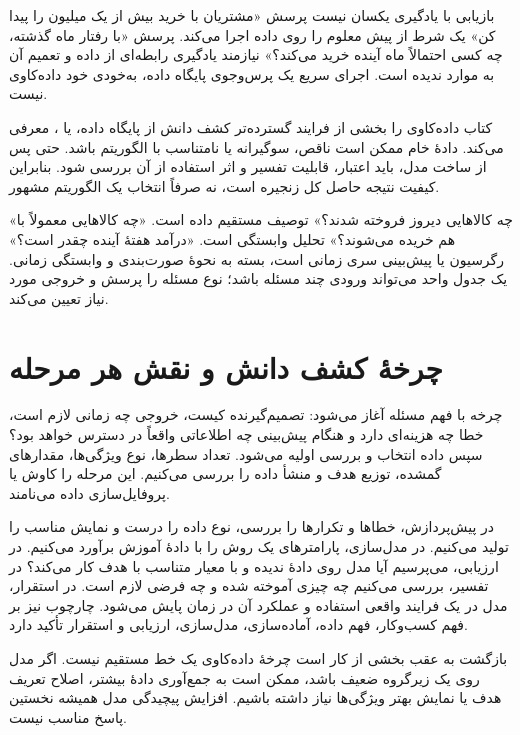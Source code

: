 \documentclass[12pt,a4paper,oneside]{report}
\newcounter{ex}[chapter]
\newenvironment{example}[1]{\refstepcounter{ex}\begin{tcolorbox}[breakable=false,title={مثال \thechapter.\arabic{ex} | #1},colframe=muted,colback=white]}{\end{tcolorbox}}
\begin{document}
\begin{definition}{بازیابی با یادگیری یکسان نیست}
پرسش «مشتریان با خرید بیش از یک میلیون را پیدا کن» یک شرط از پیش معلوم را روی داده اجرا می‌کند. پرسش «با رفتار ماه گذشته، چه کسی احتمالاً ماه آینده خرید می‌کند؟» نیازمند یادگیری رابطه‌ای از داده و تعمیم آن به موارد ندیده است. اجرای سریع یک پرس‌وجوی پایگاه داده، به‌خودی خود داده‌کاوی نیست.
\end{definition}

کتاب داده‌کاوی را بخشی از فرایند گسترده‌تر کشف دانش از پایگاه داده، یا ، معرفی می‌کند. دادهٔ خام ممکن است ناقص، سوگیرانه یا نامتناسب با الگوریتم باشد. حتی پس از ساخت مدل، باید اعتبار، قابلیت تفسیر و اثر استفاده از آن بررسی شود. بنابراین کیفیت نتیجه حاصل کل زنجیره است، نه صرفاً انتخاب یک الگوریتم مشهور.

\begin{example}{سه پرسش دربارهٔ یک فروشگاه}
«چه کالاهایی دیروز فروخته شدند؟» توصیف مستقیم داده است. «چه کالاهایی معمولاً با هم خریده می‌شوند؟» تحلیل وابستگی است. «درآمد هفتهٔ آینده چقدر است؟» رگرسیون یا پیش‌بینی سری زمانی است، بسته به نحوهٔ صورت‌بندی و وابستگی زمانی. یک جدول واحد می‌تواند ورودی چند مسئله باشد؛ نوع مسئله را پرسش و خروجی مورد نیاز تعیین می‌کند.
\end{example}

\section{چرخهٔ کشف دانش و نقش هر مرحله}
چرخه با فهم مسئله آغاز می‌شود: تصمیم‌گیرنده کیست، خروجی چه زمانی لازم است، خطا چه هزینه‌ای دارد و هنگام پیش‌بینی چه اطلاعاتی واقعاً در دسترس خواهد بود؟ سپس داده انتخاب و بررسی اولیه می‌شود. تعداد سطرها، نوع ویژگی‌ها، مقدارهای گمشده، توزیع هدف و منشأ داده را بررسی می‌کنیم. این مرحله را کاوش یا پروفایل‌سازی داده می‌نامند.

در پیش‌پردازش، خطاها و تکرارها را بررسی، نوع داده را درست و نمایش مناسب را تولید می‌کنیم. در مدل‌سازی، پارامترهای یک روش را با دادهٔ آموزش برآورد می‌کنیم. در ارزیابی، می‌پرسیم آیا مدل روی دادهٔ ندیده و با معیار متناسب با هدف کار می‌کند؟ در تفسیر، بررسی می‌کنیم چه چیزی آموخته شده و چه فرضی لازم است. در استقرار، مدل در یک فرایند واقعی استفاده و عملکرد آن در زمان پایش می‌شود. چارچوب  نیز بر فهم کسب‌وکار، فهم داده، آماده‌سازی، مدل‌سازی، ارزیابی و استقرار تأکید دارد.

\begin{result}{بازگشت به عقب بخشی از کار است}
چرخهٔ داده‌کاوی یک خط مستقیم نیست. اگر مدل روی یک زیرگروه ضعیف باشد، ممکن است به جمع‌آوری دادهٔ بیشتر، اصلاح تعریف هدف یا نمایش بهتر ویژگی‌ها نیاز داشته باشیم. افزایش پیچیدگی مدل همیشه نخستین پاسخ مناسب نیست.
\end{result}
\end{document}
